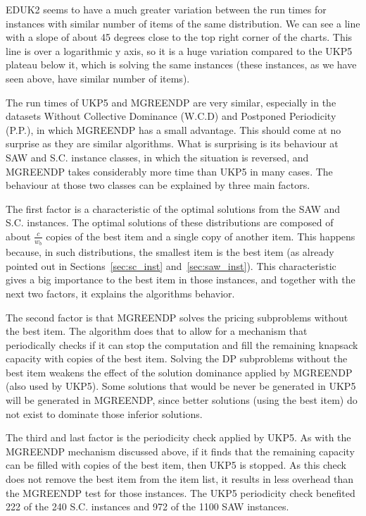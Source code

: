 EDUK2 seems to have a much greater variation between the run times for instances with similar number of items of the same distribution.
We can see a line with a slope of about 45 degrees close to the top right corner of the charts.
This line is over a logarithmic y axis, so it is a huge variation compared to the UKP5 plateau below it, which is solving the same instances (these instances, as we have seen above, have similar number of items).

The run times of UKP5 and MGREENDP are very similar, especially in the datasets Without Collective Dominance (W.C.D) and Postponed Periodicity (P.P.), in which MGREENDP has a small advantage. %
This should come at no surprise as they are similar algorithms.
What is surprising is its behaviour at SAW and S.C. instance classes, in which the situation is reversed, and MGREENDP takes considerably more time than UKP5 in many cases.
The behaviour at those two classes can be explained by three main factors.

The first factor is a characteristic of the optimal solutions from the SAW and S.C. instances.
The optimal solutions of these distributions are composed of about \(\frac{c}{w_b}\) copies of the best item and a single copy of another item.
This happens because, in such distributions, the smallest item is the best item (as already pointed out in Sections~\ref{sec:sc_inst} and~\ref{sec:saw_inst}).
This characteristic gives a big importance to the best item in those instances, and together with the next two factors, it explains the algorithms behavior.

The second factor is that MGREENDP solves the pricing subproblems without the best item.
The algorithm does that to allow for a mechanism that periodically checks if it can stop the computation and fill the remaining knapsack capacity with copies of the best item.
Solving the DP subproblems without the best item weakens the effect of the solution dominance applied by MGREENDP (also used by UKP5).
Some solutions that would be never be generated in UKP5 will be generated in MGREENDP, since better solutions (using the best item) do not exist to dominate those inferior solutions.

The third and last factor is the periodicity check applied by UKP5.
As with the MGREENDP mechanism discussed above, if it finds that the remaining capacity can be filled with copies of the best item, then UKP5 is stopped.
As this check does not remove the best item from the item list, it results in less overhead than the MGREENDP test for those instances.
The UKP5 periodicity check benefited 222 of the 240 S.C. instances and 972 of the 1100 SAW instances. %

